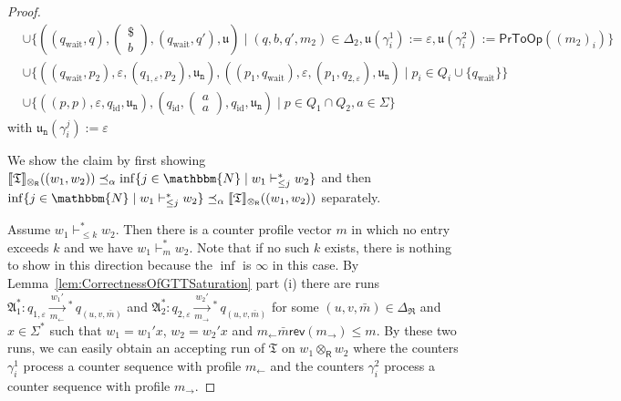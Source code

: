 \documentclass{LMCS}
\newcommand{\apathS}[2][]{\xrightarrow[#1]{#2}\!\!{}^*\,}
\newcommand{\nat}{\mathbbm{N}}
\newcommand{\eps}{\varepsilon}
\newcommand{\DeltaR}{\Delta_{\mathfrak R}}
\newcommand{\automatonA}{\mathfrak A}
\newcommand{\automatonT}{\mathfrak T}
\newcommand{\semantics}[1]{\llbracket#1\rrbracket}
\newcommand{\costlea}[1][\alpha]{\preceq_{#1}}
\newcommand{\configstepsCost}[2][*]{\vdash^{#1}_{#2}}
\newcommand{\configstepsLesserCost}[2][*]{\vdash^{#1}_{\le #2}}
\newcommand{\padprodR}{\otimes_{\mathsf{R}}}
\newcommand{\rl}{m_{\leftarrow}}
\newcommand{\rr}{m_{\rightarrow}}
\newcommand{\rev}{\mathsf{rev}}
\newcommand{\nOp}{\ensuremath{\mathtt{n}}}
\newcommand{\profileToOp}{\mathsf{PrToOp}}
\newcommand{\fraku}{\mathfrak u}
\newcommand{\twovec}[2]{\begin{pmatrix}#1 \\ #2\end{pmatrix}}
\begin{document}
\begin{proof}
\begin{align*}
	      &\cup \{((q_{\mathrm{wait}},q),\twovec{\$}{b},(q_{\mathrm{wait}},q'),\fraku) \mid (q,b,q',m_2) \in \Delta_2, \fraku(\gamma^1_i) := \eps, \fraku(\gamma^2_i) := \profileToOp((m_2)_i)\} \\
	      &\cup \{((q_{\mathrm{wait}},p_2),\eps,(q_{1,\eps},p_2),\fraku_{\nOp}),((p_1,q_{\mathrm{wait}}),\eps,(p_1,q_{2,\eps}),\fraku_{\nOp}) \mid p_i \in Q_i \cup \{q_{\mathrm{wait}}\} \} \\
	      &\cup \{ ((p,p),\eps,q_{\mathrm{id}},\fraku_{\nOp}), (q_{\mathrm{id}},\twovec{a}{a},q_{\mathrm{id}},\fraku_{\nOp}) \mid p \in Q_1 \cap Q_2, a \in \Sigma\}
\end{align*}
with $\fraku_{\nOp}(\gamma^j_i) := \eps$

We show the claim by first showing $\semantics{\automatonT}_{\padprodR}((w_1,w_2)) \costlea \inf \{ j \in \nat \mid  w_1 \configstepsLesserCost{j} w_2 \}$ and then $\inf \{ j \in \nat \mid  w_1 \configstepsLesserCost{j} w_2 \} \costlea \semantics{\automatonT}_{\padprodR}((w_1,w_2))$ separately.

Assume $w_1 \configstepsLesserCost{k} w_2$. Then there is a counter profile vector $m$ in which no entry exceeds $k$ and we have $w_1 \configstepsCost{m} w_2$. Note that if no such $k$ exists, there is nothing to show in this direction because the $\inf$ is $\infty$ in this case. By Lemma~\ref{lem:CorrectnessOfGTTSaturation} part (i) there are runs $\automatonA^*_1: q_{1,\eps} \apathS[\rl]{w_1'} q_{(u,v,\bar m)}$ and $\automatonA^*_2: q_{2,\eps}
\apathS[\rr]{w_2'} q_{(u,v,\bar m)}$ for some $(u,v,\bar m) \in \DeltaR$ and $x \in \Sigma^*$ such that $w_1 = w_1'x$, $w_2 = w_2'x$  and $\rl \bar m \rev(\rr)
\le m$. By these two runs, we can easily obtain an accepting run of $\automatonT$ on $w_1 \padprodR w_2$ where the counters $\gamma^1_i$ process a counter sequence with profile $\rl$ and the counters $\gamma^2_i$ process a counter sequence with profile $\rr$. 


\end{proof}
\end{document}
